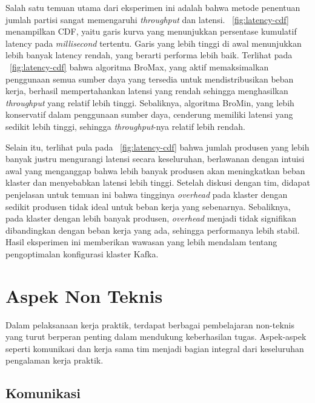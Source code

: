 Salah satu temuan utama dari eksperimen ini adalah bahwa metode penentuan jumlah partisi sangat memengaruhi \textit{throughput} dan latensi. \pic~\ref{fig:latency-cdf} menampilkan CDF, yaitu garis kurva yang menunjukkan persentase kumulatif latency pada \textit{millisecond} tertentu. Garis yang lebih tinggi di awal menunjukkan lebih banyak latency rendah, yang berarti performa lebih baik. Terlihat pada \pic~\ref{fig:latency-cdf} bahwa algoritma BroMax, yang aktif memaksimalkan penggunaan semua sumber daya yang tersedia untuk mendistribusikan beban kerja, berhasil mempertahankan latensi yang rendah sehingga menghasilkan \textit{throughput} yang relatif lebih tinggi. Sebaliknya, algoritma BroMin, yang lebih konservatif dalam penggunaan sumber daya, cenderung memiliki latensi yang sedikit lebih tinggi, sehingga \textit{throughput}-nya relatif lebih rendah.

Selain itu, terlihat pula pada \pic~\ref{fig:latency-cdf} bahwa jumlah produsen yang lebih banyak justru mengurangi latensi secara keseluruhan, berlawanan dengan intuisi awal yang menganggap bahwa lebih banyak produsen akan meningkatkan beban klaster dan menyebabkan latensi lebih tinggi. Setelah diskusi dengan tim, didapat penjelasan untuk temuan ini bahwa tingginya \textit{overhead} pada klaster dengan sedikit produsen tidak ideal untuk beban kerja yang sebenarnya. Sebaliknya, pada klaster dengan lebih banyak produsen, \textit{overhead} menjadi tidak signifikan dibandingkan dengan beban kerja yang ada, sehingga performanya lebih stabil. Hasil eksperimen ini memberikan wawasan yang lebih mendalam tentang pengoptimalan konfigurasi klaster Kafka.

\section{Aspek Non Teknis}

Dalam pelaksanaan kerja praktik, terdapat berbagai pembelajaran non-teknis yang turut berperan penting dalam mendukung keberhasilan tugas. Aspek-aspek seperti komunikasi dan kerja sama tim menjadi bagian integral dari keseluruhan pengalaman kerja praktik.

\subsection{Komunikasi}

